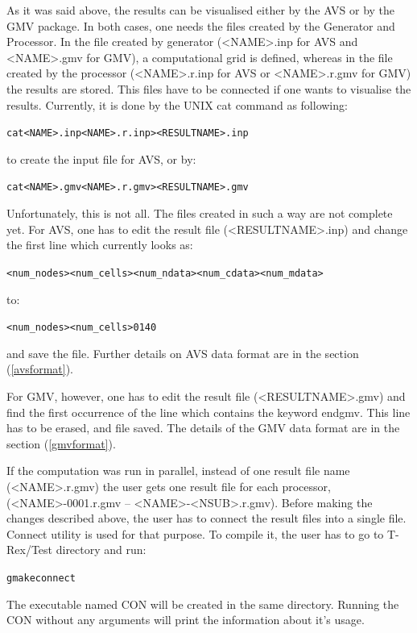 \documentclass[10pt]{article}
\newcommand*{\tc}{\ttfamily} %
\newcommand*{\tn}{\sffamily} %
\begin{document}
    As it was said above, the results can be visualised either
    by the AVS or by the GMV package. In both cases, one needs
    the files created by the {\tn Generator} and {\tn Processor}.
    In the file created by generator ({\tc <NAME>.inp} for AVS and
    {\tc <NAME>.gmv for GMV}), a computational grid is 
    defined, whereas in the file created by the processor 
    ({\tc <NAME>.r.inp} for AVS or {\tc <NAME>.r.gmv} for GMV) the
    results are stored. This files have to be connected if one
    wants to visualise the results. Currently, it is done by the
    UNIX {\tc cat} command as following:
    \begin{alltt}
    cat <NAME>.inp <NAME>.r.inp > <RESULTNAME>.inp
    \end{alltt}
    to create the input file for AVS, or by:
    \begin{alltt}
    cat <NAME>.gmv <NAME>.r.gmv > <RESULTNAME>.gmv
    \end{alltt}
    Unfortunately, this is not all. The files created in such a way
    are not complete yet. 
    For AVS, one has to edit the result file ({\tc <RESULTNAME>.inp})
    and change the first line which currently looks as:
    \begin{alltt}
    <num_nodes> <num_cells> <num_ndata> <num_cdata> <num_mdata>
    \end{alltt}
    to: 
    \begin{alltt}
    <num_nodes> <num_cells>    0    14     0 
    \end{alltt}
    and save the file. Further details on AVS data format are in 
    the section (\ref{avsformat}).

    For GMV, however, one has to edit the result file 
    ({\tc <RESULTNAME>.gmv}) and find the first occurrence of the
    line which contains the keyword {\tc endgmv}. This line has to
    be erased, and file saved. The details of the GMV data format 
    are in the section (\ref{gmvformat}).  

    If the computation was run in parallel, instead of one result
    file name ({\tc <NAME>.r.gmv}) the user gets one result file for each
    processor, ({\tc <NAME>-0001.r.gmv} -- {\tc <NAME>-<NSUB>.r.gmv}).
    Before making the changes described above, the user has to
    connect the result files into a single file. 
    {\tn Connect} utility is used for that purpose. To compile
    it, the user has to go to {\tc T-Rex/Test}
    directory and run:
    \begin{alltt}
    gmake connect
    \end{alltt}
    The executable named {\tc CON} will be created in the same
    directory. Running the {\tc CON} without any arguments will
    print the information about it's usage.  
\end{document}

